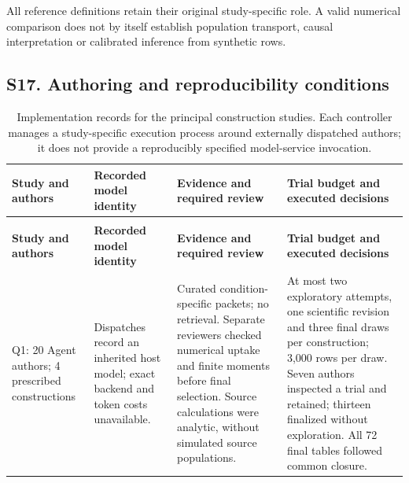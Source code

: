 \documentclass[11pt,letterpaper]{article}
\begin{document}
All reference definitions retain their original study-specific role. A valid numerical comparison does not by itself establish population transport, causal interpretation or calibrated inference from synthetic rows.


\clearpage

\subsection*{S17. Authoring and reproducibility conditions}

\FloatBarrier

\begingroup

\small

\renewcommand{\arraystretch}{1.22}

\begin{xltabular}{\linewidth}{@{}>{\raggedright\arraybackslash}X>{\raggedright\arraybackslash}X>{\raggedright\arraybackslash}X>{\raggedright\arraybackslash}X@{}}

\caption{Implementation records for the principal construction studies. Each controller manages a study-specific execution process around externally dispatched authors; it does not provide a reproducibly specified model-service invocation.}\label{tab:15} \\

\toprule

\textbf{Study and authors} & \textbf{Recorded model identity} & \textbf{Evidence and required review} & \textbf{Trial budget and executed decisions} \\

\midrule

\endfirsthead

\\

\toprule

\textbf{Study and authors} & \textbf{Recorded model identity} & \textbf{Evidence and required review} & \textbf{Trial budget and executed decisions} \\

\midrule

\endhead

\bottomrule

\endfoot

Q1: 20 Agent authors; 4 prescribed constructions & Dispatches record an inherited host model; exact backend and token costs unavailable. & Curated condition-specific packets; no retrieval. Separate reviewers checked numerical uptake and finite moments before final selection. Source calculations were analytic, without simulated source populations. & At most two exploratory attempts, one scientific revision and three final draws per construction; 3,000 rows per draw. Seven authors inspected a trial and retained; thirteen finalized without exploration. All 72 final tables followed common closure. \\


\end{xltabular}
\end{document}
